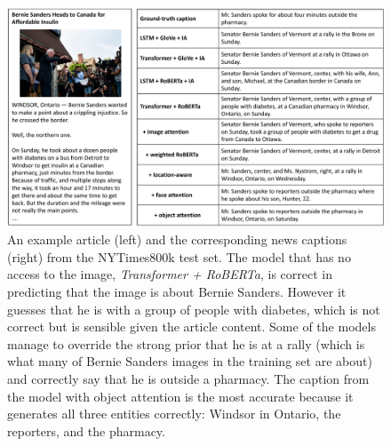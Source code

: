 \documentclass[10pt,twocolumn,letterpaper]{article}
\begin{document}
\begin{figure}[p]
   \begin{center}
      \includegraphics[width=\linewidth]{figures/sanders.pdf}
   \end{center}
   \caption{An example article (left) and the corresponding news captions
      (right) from the NYTimes800k test set. The model that has no access to
      the image, \textit{Transformer + RoBERTa}, is correct in predicting that
      the image is about Bernie Sanders. However it guesses that he is with a
      group of people with diabetes, which is not correct but is sensible given
      the article content. Some of the models manage to override the strong
      prior that he is at a rally (which is what many of Bernie Sanders images
      in the training set are about) and correctly say that he is outside a
      pharmacy. The caption from the model with object attention is the most
      accurate because it generates all three entities correctly: Windsor in
      Ontario, the reporters, and the pharmacy. }
   \label{fig:sanders}
\end{figure}
\end{document}
